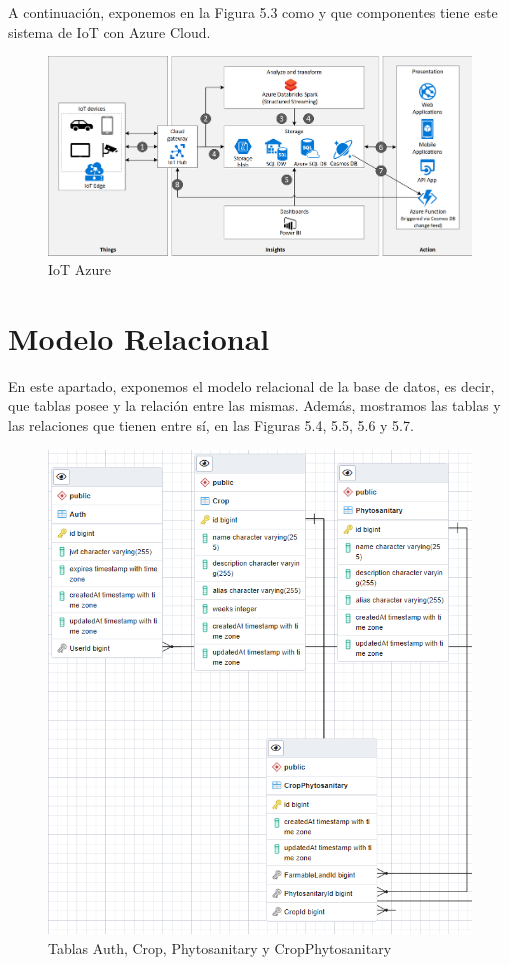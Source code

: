 A continuación, exponemos en la Figura 5.3 como y que componentes tiene este sistema de IoT con Azure Cloud.

\begin{figure}[H]
    \centering
    \includegraphics[width=1\linewidth]{images/design/iot-using-cosmos-db.png}
    \caption{IoT Azure \cite{iot-azure}}
\end{figure}

\section{Modelo Relacional}
En este apartado, exponemos el modelo relacional de la base de datos, es decir, que tablas posee y la relación entre las mismas. Además, mostramos las tablas y las relaciones que tienen entre sí, en las Figuras 5.4, 5.5, 5.6 y 5.7.

\begin{figure}[H]
    \centering
    \includegraphics[width=1\linewidth]{images/design/erd1.png}
    \caption{Tablas Auth, Crop, Phytosanitary y CropPhytosanitary}
\end{figure}

